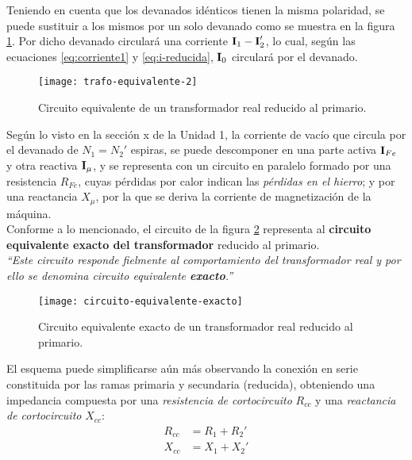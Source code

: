 Teniendo en cuenta que los devanados idénticos tienen la misma polaridad, se puede sustituir a los mismos por un solo devanado como se muestra en la figura \ref{fig:trafo-un-devanado}. Por dicho devanado circulará una corriente $\fasor{i}_1 - \fasor{i}_2'$, lo cual, según las ecuaciones \ref{eq:corriente1} y \ref{eq:i-reducida}, $\fasor{i}_0$ circulará por el devanado.


\begin{figure}[H]
	\centering
	\texttt{[image: trafo-equivalente-2]}
	\caption{Circuito equivalente de un transformador real reducido al primario.}
	\label{fig:trafo-un-devanado}
\end{figure}

Según lo visto en la sección x de la Unidad 1, la corriente de vacío que circula por el devanado de $N_1=N_2'$ espiras, se puede descomponer en una parte activa $\fasor{i}_{Fe}$ y otra reactiva $\fasor{i}_\mu$, y se representa con un circuito en paralelo formado por una resistencia $R_{Fe}$, cuyas pérdidas por calor indican las \textsl{pérdidas en el hierro}; y por una reactancia $X_{\mu}$, por la que se deriva la corriente de magnetización de la máquina.\\


Conforme a lo mencionado, el circuito de la figura \ref{fig:circuito-equivalente-exacto} representa al \textbf{circuito equivalente exacto del transformador} reducido al primario.\\


\textsl{``Este circuito responde fielmente al comportamiento del transformador real y por ello se denomina circuito equivalente \textbf{exacto}.''} %

\begin{figure}[H]
	\centering
	\texttt{[image: circuito-equivalente-exacto]}
	\caption{Circuito equivalente exacto de un transformador real reducido al primario.}
	\label{fig:circuito-equivalente-exacto}
\end{figure}


El esquema puede simplificarse aún más observando la conexión en serie constituida por las ramas primaria y secundaria (reducida), obteniendo una impedancia compuesta por una \textsl{resistencia de cortocircuito} $R_{cc}$ y una \textsl{reactancia de cortocircuito} $X_{cc}$:
\begin{equation}
	\begin{aligned}
		R_{cc} &= R_1 + R_2'\\
		X_{cc} &= X_1 + X_2'
	\end{aligned}
\end{equation}

